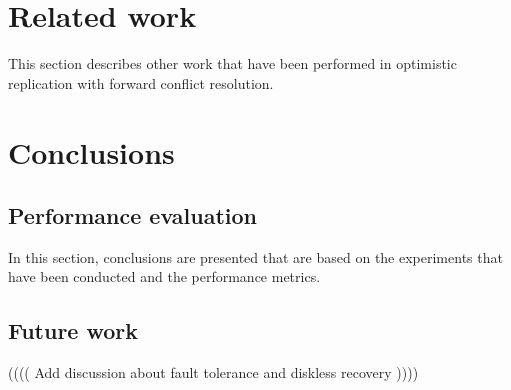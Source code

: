 \documentclass[MSc, ida]{histhesis}
\begin{document}
\section{Related work} %
\label{sec:future_work}

This section describes other work that have been performed in optimistic replication with forward conflict resolution.

\section{Conclusions} %
\label{sec:conclusion}


\subsection{Performance evaluation} %
\label{sub:performance_evaluation}

In this section, conclusions are presented that are based on the experiments that have been conducted and the performance metrics.

\subsection{Future work} %
\label{sub:future_work}

(((( Add discussion about fault tolerance and diskless recovery ))))

\newpage



\end{document}
